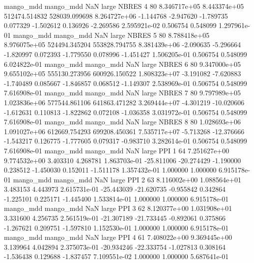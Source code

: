 mango_mdd mango_mdd                   NaN      large    NBRES                 4 80 8.346717e+05   8.443374e+05 512474.514832  528039.099698  8.264727e+06     -1.144768     -2.947620    -1.789735       0.077329 -1.502612   0.136926    -2.269586   2.595921e-02            0.506754        0.548099        1.297961e-01
mango_mdd mango_mdd                   NaN      large    NBRES                 5 80 8.788418e+05   8.976075e+05 524494.345204  553828.794755  8.381439e+06     -2.090635     -5.296664    -1.820997       0.072393 -1.779550   0.078996    -1.451427   1.506205e-01            0.506754        0.548099        6.024822e-01
mango_mdd mango_mdd                   NaN      large    NBRES                 6 80 9.347000e+05   9.655102e+05 555130.273956  600926.150522  1.808323e+07     -3.191082     -7.620883    -1.740489       0.085667 -1.846857   0.068512    -1.149307   2.538969e-01            0.506754        0.548099        7.616908e-01
mango_mdd mango_mdd                   NaN      large    NBRES                 7 80 9.797989e+05   1.023836e+06 577544.861106  641863.471282  3.269444e+07     -4.301219    -10.020606    -1.612631       0.110813 -1.822862   0.072108    -1.036358   3.031972e-01            0.506754        0.548099        7.616908e-01
mango_mdd mango_mdd                   NaN      large    NBRES                 8 80 1.028693e+06   1.091027e+06 612669.754293  699208.450361  7.535717e+07     -5.713268    -12.376666    -1.543217       0.126775 -1.777605   0.079317    -0.983710   3.282614e-01            0.506754        0.548099        7.616908e-01
mango_mdd mango_mdd                   NaN      large      PPI                 1 64 7.251627e+00   9.774532e+00      3.403310       4.268781  1.863703e-01    -25.811006    -20.274429    -1.190000       0.238512 -1.450030   0.152011    -1.511178   1.357432e-01            1.000000        1.000000        6.915178e-01
mango_mdd mango_mdd                   NaN      large      PPI                 2 63 8.116002e+00   1.088564e+01      3.483153       4.443973  2.615731e-01    -25.443039    -21.620735    -0.955842       0.342864 -1.225101   0.225171    -1.445400   1.533814e-01            1.000000        1.000000        6.915178e-01
mango_mdd mango_mdd                   NaN      large      PPI                 3 62 8.120377e+00   1.031908e+01      3.331600       4.256735  2.561519e-01    -21.307189    -21.733445    -0.892061       0.375866 -1.267621   0.209751    -1.597810   1.152530e-01            1.000000        1.000000        6.915178e-01
mango_mdd mango_mdd                   NaN      large      PPI                 4 61 7.408022e+00   9.369445e+00      3.139964       4.042894  2.375073e-01    -20.934246    -22.333754    -1.027813       0.308164 -1.536438   0.129688    -1.837457   7.109551e-02            1.000000        1.000000        5.687641e-01
